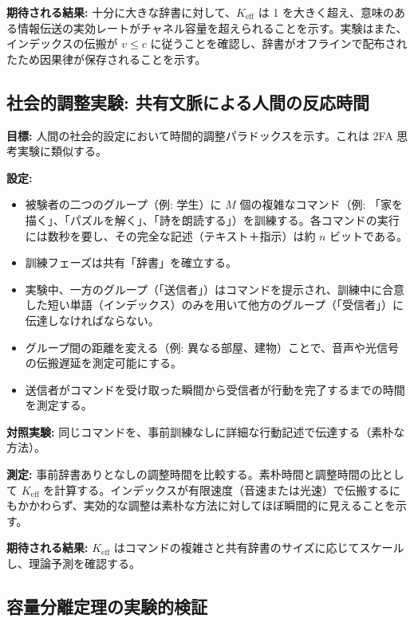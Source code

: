 \documentclass[12pt,a4paper]{ltjsarticle}
\begin{document}
	\textbf{期待される結果:} 十分に大きな辞書に対して、\(K_{\mathrm{eff}}\) は 1 を大きく超え、意味のある情報伝送の実効レートがチャネル容量を超えられることを示す。実験はまた、インデックスの伝搬が \(v \le c\) に従うことを確認し、辞書がオフラインで配布されたため因果律が保存されることを示す。
	
	\subsection{社会的調整実験: 共有文脈による人間の反応時間}
	\label{subsec:social-experiment}
	
	\textbf{目標:} 人間の社会的設定において時間的調整パラドックスを示す。これは 2FA 思考実験に類似する。
	
	\textbf{設定:}
	\begin{itemize}
		\item 被験者の二つのグループ（例: 学生）に \(M\) 個の複雑なコマンド（例: 「家を描く」、「パズルを解く」、「詩を朗読する」）を訓練する。各コマンドの実行には数秒を要し、その完全な記述（テキスト＋指示）は約 \(n\) ビットである。
		\item 訓練フェーズは共有「辞書」を確立する。
		\item 実験中、一方のグループ（「送信者」）はコマンドを提示され、訓練中に合意した短い単語（インデックス）のみを用いて他方のグループ（「受信者」）に伝達しなければならない。
		\item グループ間の距離を変える（例: 異なる部屋、建物）ことで、音声や光信号の伝搬遅延を測定可能にする。
		\item 送信者がコマンドを受け取った瞬間から受信者が行動を完了するまでの時間を測定する。
	\end{itemize}
	
	\textbf{対照実験:} 同じコマンドを、事前訓練なしに詳細な行動記述で伝達する（素朴な方法）。
	
	\textbf{測定:} 事前辞書ありとなしの調整時間を比較する。素朴時間と調整時間の比として \(K_{\mathrm{eff}}\) を計算する。インデックスが有限速度（音速または光速）で伝搬するにもかかわらず、実効的な調整は素朴な方法に対してほぼ瞬間的に見えることを示す。
	
	\textbf{期待される結果:} \(K_{\mathrm{eff}}\) はコマンドの複雑さと共有辞書のサイズに応じてスケールし、理論予測を確認する。
	
	\subsection{容量分離定理の実験的検証}
	\label{subsec:capacity-theorem}
	
\end{document}
